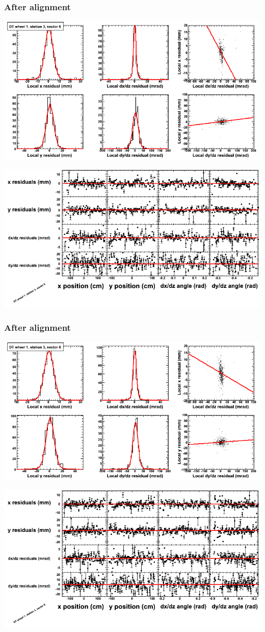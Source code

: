 \documentclass[compress]{beamer}
\begin{document}
\begin{frame}
\frametitle{After alignment}
\includegraphics[width=0.7\linewidth]{NOV4_fitfunctions/MBwhDst3sec06_bellcurves.png}

\includegraphics[width=0.7\linewidth]{NOV4_fitfunctions/MBwhDst3sec06_polynomials.png}
\end{frame}

\begin{frame}
\frametitle{After alignment}
\includegraphics[width=0.7\linewidth]{NOV4_fitfunctions/MBwhDst3sec08_bellcurves.png}

\includegraphics[width=0.7\linewidth]{NOV4_fitfunctions/MBwhDst3sec08_polynomials.png}
\end{frame}
\end{document}
